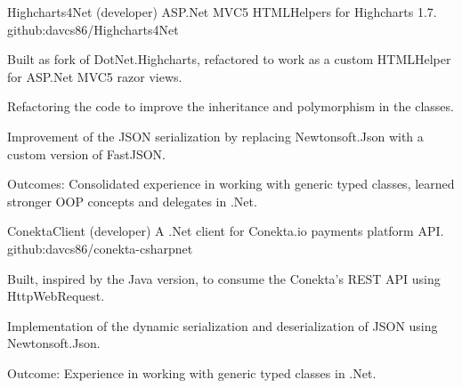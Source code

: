 \begin{cventries}

\cventry
{Highcharts4Net (developer)} %
{ASP.Net MVC5 HTMLHelpers for Highcharts 1.7.} %
{ } %
{github:davcs86/Highcharts4Net} %
{ %
	\begin{cvitems}
		\item {Built as fork of DotNet.Highcharts, refactored to work as a custom HTMLHelper for ASP.Net MVC5 razor views.}
		\item {Refactoring the code to improve the inheritance and polymorphism in the classes.}
		\item {Improvement of the JSON serialization by replacing Newtonsoft.Json with a custom version of FastJSON.}
		\item {Outcomes: Consolidated experience in working with generic typed classes, learned stronger OOP concepts and delegates in .Net.}
	\end{cvitems}
}


\cventry
{ConektaClient (developer)} %
{A .Net client for Conekta.io payments platform API.} %
{ } %
{github:davcs86/conekta-csharpnet} %
{ %
	\begin{cvitems}
		\item {Built, inspired by the Java version, to consume the Conekta's REST API using HttpWebRequest.}
		\item {Implementation of the dynamic serialization and deserialization of JSON using Newtonsoft.Json.}
		\item {Outcome: Experience in working with generic typed classes in .Net.}
	\end{cvitems}
}

\end{cventries}